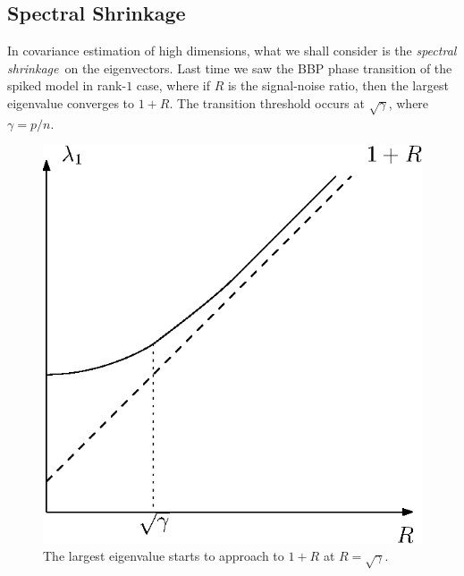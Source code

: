 \documentclass[11pt]{article}
\theoremstyle{definition}
\begin{document}
\subsection{Spectral Shrinkage}
In covariance estimation of high dimensions, what we shall consider is the {\it spectral shrinkage}\ on the eigenvectors. Last time we saw the BBP phase transition of the spiked model in rank-$1$ case, where if $R$ is the signal-noise ratio, then the largest eigenvalue converges  to $1+R$. The transition threshold occurs at $\sqrt{\gamma}$, where $\gamma = p/n$.
\begin{figure}[htbp]
    \centering
    \includegraphics[scale=.85]{./fig/bbp.eps}
    \caption{The largest eigenvalue starts to approach to $1+R$ at $R= \sqrt{\gamma}$.}
\end{figure}
\end{document}

